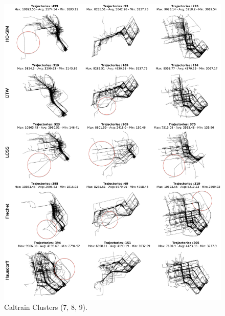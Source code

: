\documentclass[a4paper, 12pt]{article}
\begin{document}
\begin{figure}[htbp!]
    \centering
    \includegraphics[width=1\textwidth]{Caltrain 3.png}
    \caption{Caltrain Clusters (7, 8, 9).}
    \label{fig42}
\end{figure}
\end{document}
